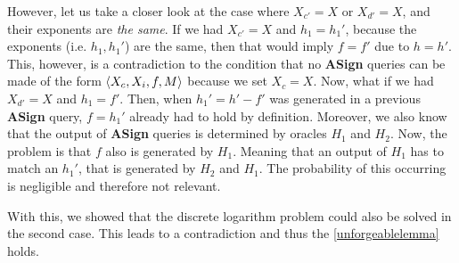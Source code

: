However, let us take a closer look at the case where \(X_{c'} = X\) or \(X_{d'} = X\), and their exponents are \textit{the same}.
If we had \(X_{c'} = X\) and \(h_1 = h_1'\), because the exponents (i.e. \(h_1, h_1'\)) are the same, then that would imply \(f = f'\) due to \(h = h'\).
This, however, is a contradiction to the condition that no \textbf{ASign} queries can be made of the form \(\langle X_c, X_i, f, M \rangle\) because we set \(X_c = X\).
Now, what if we had \(X_{d'} = X\) and \(h_1 = f'\).
Then, when \(h_1' = h' - f'\) was generated in a previous \textbf{ASign} query, \(f = h_1'\) already had to hold by definition.
Moreover, we also know that the output of \textbf{ASign} queries is determined by oracles \(H_1\) and \(H_2\).
Now, the problem is that \(f\) also is generated by \(H_1\). 
Meaning that an output of \(H_1\) has to match an \(h_1'\), that is generated by \(H_2\) and \(H_1\).
The probability of this occurring is negligible and therefore not relevant. 

With this, we showed that the discrete logarithm problem could also be solved in the second case.
This leads to a contradiction and thus the \cref{unforgeablelemma} holds.
